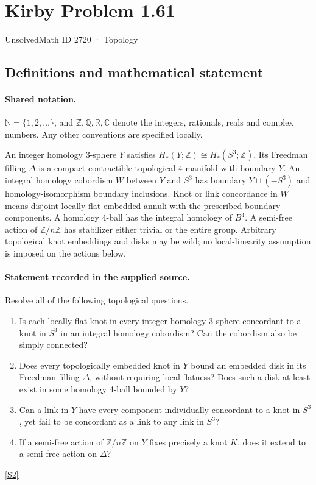 \documentclass[11pt]{article}
\newcommand{\sref}[2]{\hyperlink{source:#1:#2}{[S#2]}}
\begin{document}
\setcounter{section}{2719}
\section{Kirby Problem 1.61}\label{2720}
{\small\sffamily UnsolvedMath ID 2720 · Topology}
\subsection{Definitions and mathematical statement}

\paragraph{Shared notation.}$\mathbb N=\{1,2,\ldots\}$, and $\mathbb Z,\mathbb Q,\mathbb R,\mathbb C$ denote the integers, rationals, reals and complex numbers. Any other conventions are specified locally.


An integer homology 3-sphere $Y$ satisfies $H_*(Y;\mathbb Z)\cong H_*(S^3;\mathbb Z)$. Its Freedman filling $\Delta$ is a compact contractible topological 4-manifold with boundary $Y$. An integral homology cobordism $W$ between $Y$ and $S^3$ has boundary $Y\sqcup(-S^3)$ and homology-isomorphism boundary inclusions. Knot or link concordance in $W$ means disjoint locally flat embedded annuli with the prescribed boundary components. A homology 4-ball has the integral homology of $B^4$. A semi-free action of $\mathbb Z/n\mathbb Z$ has stabilizer either trivial or the entire group. Arbitrary topological knot embeddings and disks may be wild; no local-linearity assumption is imposed on the actions below.
\paragraph{Statement recorded in the supplied source.}
Resolve all of the following topological questions.
\begin{enumerate}
\item Is each locally flat knot in every integer homology 3-sphere concordant to a knot in $S^3$ in an integral homology cobordism? Can the cobordism also be simply connected?
\item Does every topologically embedded knot in $Y$ bound an embedded disk in its Freedman filling $\Delta$, without requiring local flatness? Does such a disk at least exist in some homology 4-ball bounded by $Y$?
\item Can a link in $Y$ have every component individually concordant to a knot in $S^3$, yet fail to be concordant as a link to any link in $S^3$?
\item If a semi-free action of $\mathbb Z/n\mathbb Z$ on $Y$ fixes precisely a knot $K$, does it extend to a semi-free action on $\Delta$?
\end{enumerate} \sref{2720}{2}
\end{document}
